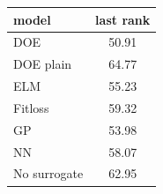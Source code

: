 \begin{tabular}{|lc|}
\hline
model & last rank\\
\hline
DOE & 50.91 \\
DOE plain & 64.77 \\
ELM & 55.23 \\
Fitloss & 59.32 \\
GP & 53.98 \\
NN & 58.07 \\
No surrogate & 62.95 \\
\hline
\end{tabular}
